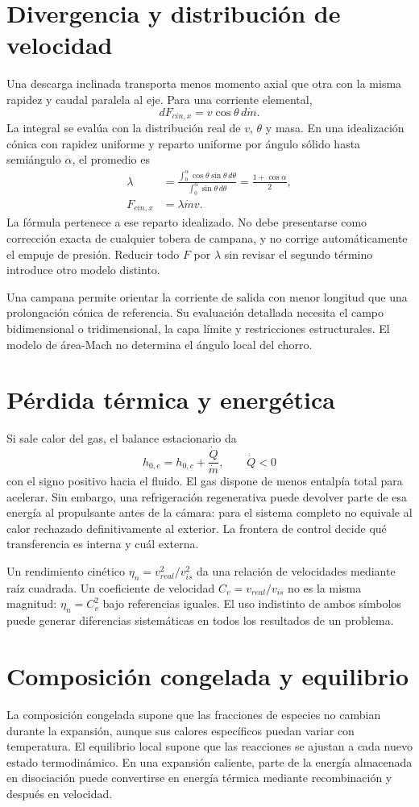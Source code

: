 \section{Divergencia y distribución de velocidad}
Una descarga inclinada transporta menos momento axial que otra con la misma rapidez y caudal paralela al eje. Para una corriente elemental,
\[
 dF_{cin,x}=v\cos\theta\,d\dot m.
\]
La integral se evalúa con la distribución real de $v$, $\theta$ y masa. En una idealización cónica con rapidez uniforme y reparto uniforme por ángulo sólido hasta semiángulo $\alpha$, el promedio es
\begin{align}
 \lambda&=\frac{\int_0^\alpha\cos\theta\sin\theta\,d\theta}
 {\int_0^\alpha\sin\theta\,d\theta}
 =\frac{1+\cos\alpha}{2},\\
 F_{cin,x}&=\lambda\dot m v.
\end{align}
La fórmula pertenece a ese reparto idealizado. No debe presentarse como corrección exacta de cualquier tobera de campana, y no corrige automáticamente el empuje de presión. Reducir todo $F$ por $\lambda$ sin revisar el segundo término introduce otro modelo distinto.

Una campana permite orientar la corriente de salida con menor longitud que una prolongación cónica de referencia. Su evaluación detallada necesita el campo bidimensional o tridimensional, la capa límite y restricciones estructurales. El modelo de área-Mach no determina el ángulo local del chorro.
\section{Pérdida térmica y energética}
Si sale calor del gas, el balance estacionario da
\[
 h_{0,e}=h_{0,c}+\frac{\dot Q}{\dot m},\qquad \dot Q<0
\]
con el signo positivo hacia el fluido. El gas dispone de menos entalpía total para acelerar. Sin embargo, una refrigeración regenerativa puede devolver parte de esa energía al propulsante antes de la cámara: para el sistema completo no equivale al calor rechazado definitivamente al exterior. La frontera de control decide qué transferencia es interna y cuál externa.

Un rendimiento cinético $\eta_n=v_{real}^2/v_{is}^2$ da una relación de velocidades mediante raíz cuadrada. Un coeficiente de velocidad $C_v=v_{real}/v_{is}$ no es la misma magnitud: $\eta_n=C_v^2$ bajo referencias iguales. El uso indistinto de ambos símbolos puede generar diferencias sistemáticas en todos los resultados de un problema.
\section{Composición congelada y equilibrio}
La composición congelada supone que las fracciones de especies no cambian durante la expansión, aunque sus calores específicos puedan variar con temperatura. El equilibrio local supone que las reacciones se ajustan a cada nuevo estado termodinámico. En una expansión caliente, parte de la energía almacenada en disociación puede convertirse en energía térmica mediante recombinación y después en velocidad.\cite{MIT12,CEA-RP1}

